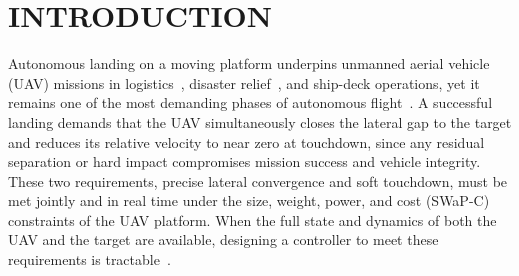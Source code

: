 \documentclass{IEEEtaes}
\theoremstyle{definition}
\theoremstyle{remark}
\begin{document}

\section{INTRODUCTION} \label{intro: section}
Autonomous landing on a moving platform underpins unmanned aerial vehicle (UAV) missions in logistics~\cite{amukele2017}, disaster relief~\cite{chowdhury2017}, and ship-deck operations, yet it remains one of the most demanding phases of autonomous flight~\cite{cho2022,gupta2023,angelis2026}. A successful landing demands that the UAV simultaneously closes the lateral gap to the target and reduces its relative velocity to near zero at touchdown, since any residual separation or hard impact compromises mission success and vehicle integrity. These two requirements, precise lateral convergence and soft touchdown, must be met jointly and in real time under the size, weight, power, and cost (SWaP-C) constraints of the UAV platform. When the full state and dynamics of both the UAV and the target are available, designing a controller to meet these requirements is tractable~\cite{kumar2024}.
\end{document}
